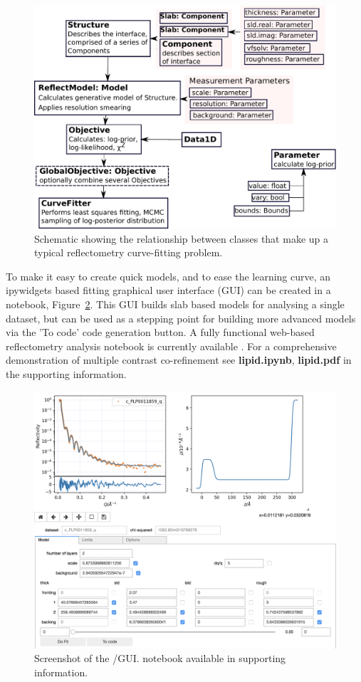 \documentclass[12pt]{article}
\begin{document}
\begin{figure}
  \includegraphics[width=\linewidth]{components}
  \caption{Schematic showing the relationship between classes that make up a typical reflectometry curve-fitting problem.}
  \label{fig:components}
\end{figure}

To make it easy to create quick models, and to ease the learning curve, an ipywidgets \cite{ipywidgets} based fitting graphical user interface (GUI) can be created in a \Jupyter notebook, Figure~\ref{fig:gui}. This GUI builds slab based models for analysing a single dataset, but can be used as a stepping point for building more advanced models via the 'To code' code generation button. A fully functional web-based reflectometry analysis notebook is currently available \cite{Nelson2018}. For a comprehensive demonstration of multiple contrast co-refinement see \textbf{lipid.ipynb}, \textbf{lipid.pdf} in the supporting information.

\begin{figure}
  \includegraphics[width=\linewidth]{./datasets/gui.png}
  \caption{Screenshot of the \Jupyter/\ipywidgets GUI. \Jupyter notebook available in supporting information.}
  \label{fig:gui}
\end{figure}
\end{document}

